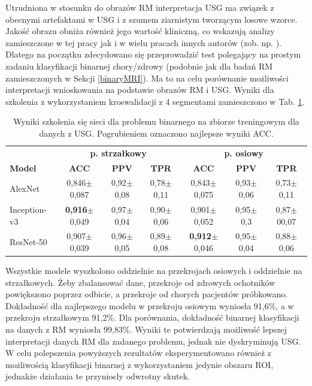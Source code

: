 Utrudniona w stosunku do obrazów RM interpretacja USG ma związek z obecnymi artefaktami w USG i z szumem ziarnistym tworzącym losowe wzorce. Jakość obrazu obniża również jego wartość kliniczną, co wskazują analizy zamieszczone w tej pracy jak i w wielu pracach innych autorów (zob. np. \cite{Khan2003, Ibrahim2013}). Dlatego na początku zdecydowano się przeprowadzić test polegający na prostym zadaniu klasyfikacji binarnej chory/zdrowy (podobnie jak dla badań RM zamieszczonych w Sekcji \ref{binaryMRI}). Ma to na celu porównanie możliwości interpretacji wnioskowania na podstawie obrazów RM i USG. Wyniki dla szkolenia z wykorzystaniem kroswalidacji z 4 segmentami zamieszczono w Tab. \ref{tab:usg-binary}.
\renewcommand{\arraystretch}{1.2}
\begin{table}[]
	\centering
	\scriptsize
	\setlength{\tabcolsep}{3pt}
	\setlength\extrarowheight{2pt}
	\caption{Wyniki szkolenia się sieci dla problemu binarnego na zbiorze treningowym dla danych z USG. Pogrubieniem oznaczono najlepsze wyniki ACC.}
	\label{tab:usg-binary}
	\begin{tabular}{l||c|c|c||c|c|c}
		& \multicolumn{3}{c}{\textbf{p. strzałkowy}} & \multicolumn{3}{c}{\textbf{p. osiowy}} \\
		\textbf{Model} & \textbf{ACC} & \textbf{PPV} & \textbf{TPR} & \textbf{ACC} & \textbf{PPV} & \textbf{TPR} \\ \hline \hline
		AlexNet & 0,846$\pm$0,087 & 0,92$\pm$0,08 & 0,78$\pm$0,11 & 0,843$\pm$0,075 & 0,93$\pm$0,06 & 0,73$\pm$0,11  \\ \hline
		Inception-v3 & \textbf{0,916}$\pm$0,049 & 0,97$\pm$0,04 & 0,90$\pm$0,06 & 0,901$\pm$0,052 & 0,95$\pm$0,3 & 0,87$\pm$00,07 \\ \hline
		ResNet-50 & 0,907$\pm$0,039 & 0,96$\pm$0,05 & 0,89$\pm$0,08 & \textbf{0,912}$\pm$0,046 & 0,95$\pm$0,04 & 0,88$\pm$0,06 \\ 
	\end{tabular}
\end{table}
\renewcommand{\arraystretch}{1}

Wszystkie modele wyszkolono oddzielnie na przekrojach osiowych i oddzielnie na strzałkowych. Żeby zbalansować dane, przekroje od zdrowych ochotników powiększono poprzez odbicie, a przekroje od chorych pacjentów próbkowano. Dokładność dla najlepszego modelu w przekroju osiowym wyniosła 91,6\%, a w przekroju strzałkowym 91,2\%. Dla porównania, dokładność binarnej klasyfikacji na danych z RM wyniosła 99,83\%. Wyniki te potwierdzają możliwość lepszej interpretacji danych RM dla zadanego problemu, jednak nie dyskryminują USG. W celu polepszenia powyższych rezultatów eksperymentowano również z możliwością klasyfikacji binarnej z wykorzystaniem jedynie obszaru ROI, jednakże działania te przyniosły odwrotny skutek.  

